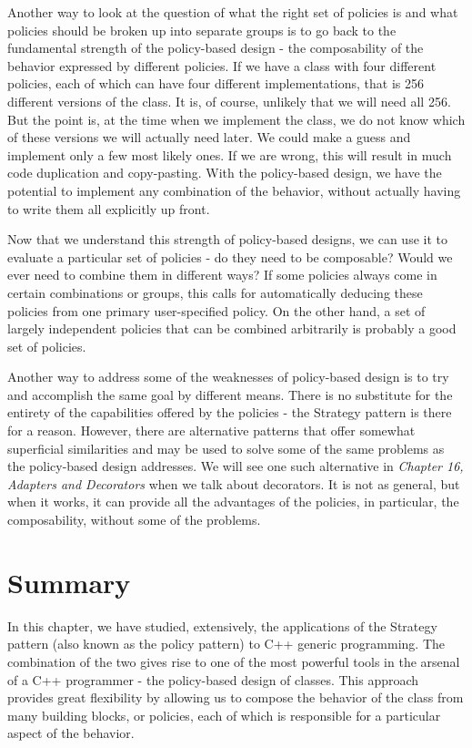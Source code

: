 Another way to look at the question of what the right set of policies is and what policies should be broken up into separate groups is to go back to the fundamental strength of the policy-based design - the composability of the behavior expressed by different policies. If we have a class with four different policies, each of which can have four different implementations, that is 256 different versions of the class. It is, of course, unlikely that we will need all 256. But the point is, at the time when we implement the class, we do not know which of these versions we will actually need later. We could make a guess and implement only a few most likely ones. If we are wrong, this will result in much code duplication and copy-pasting. With the policy-based design, we have the potential to implement any combination of the behavior, without actually having to write them all explicitly up front.

Now that we understand this strength of policy-based designs, we can use it to evaluate a particular set of policies - do they need to be composable? Would we ever need to combine them in different ways? If some policies always come in certain combinations or groups, this calls for automatically deducing these policies from one primary user-specified policy. On the other hand, a set of largely independent policies that can be combined arbitrarily is probably a good set of policies.

Another way to address some of the weaknesses of policy-based design is to try and accomplish the same goal by different means. There is no substitute for the entirety of the capabilities offered by the policies - the Strategy pattern is there for a reason. However, there are alternative patterns that offer somewhat superficial similarities and may be used to solve some of the same problems as the policy-based design addresses. We will see one such alternative in \emph{Chapter 16, Adapters and Decorators} when we talk about decorators. It is not as general, but when it works, it can provide all the advantages of the policies, in particular, the composability, without some of the problems.

\section{Summary}

In this chapter, we have studied, extensively, the applications of the Strategy pattern (also known as the policy pattern) to C++ generic programming. The combination of the two gives rise to one of the most powerful tools in the arsenal of a C++ programmer - the policy-based design of classes. This approach provides great flexibility by allowing us to compose the behavior of the class from many building blocks, or policies, each of which is responsible for a particular aspect of the behavior.

